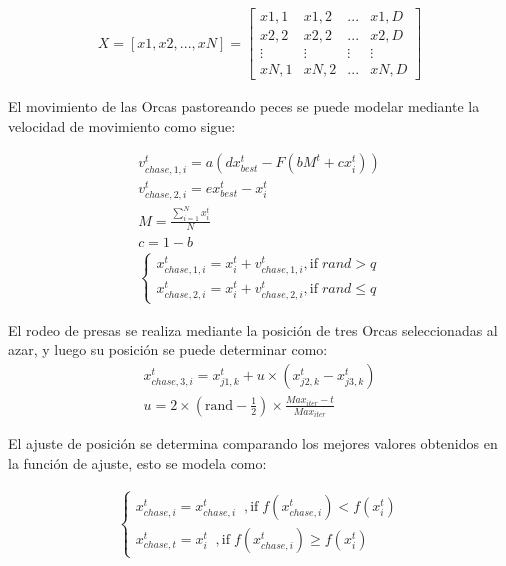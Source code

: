 \documentclass[conference]{IEEEtran}
\begin{document}
\begin{equation}
\begin{gathered}
X = [ x1, x2, ..., xN ] =\begin{bmatrix}
  x1,1 & x1,2 & ... & x1,D  \\
  x2,2 & x2,2 & ... & x2,D  \\
  \vdots & \vdots & \vdots & \vdots \\
  xN,1 & xN,2 & ... & xN,D
\end{bmatrix}
\end{gathered}
\label{eq18}
\end{equation}

\noindent El movimiento de las Orcas pastoreando peces se puede modelar mediante la velocidad de movimiento como sigue:

\begin{equation}
\begin{gathered}
v_{chase,1,i}^t = a ( d x_{best}^t - F (b M^t + c x_i^t)) \\
v_{chase,2,i}^t = e x_{best}^t - x_{i}^t \\
M = \frac{\sum_{i=1}^{N} x_i^t}{N} \\
c=1-b \\
\begin{cases}
  x_{chase,1,i}^t = x_{i}^t + v_{chase,1,i}^t , \text{if} \;rand > q \\
  x_{chase,2,i}^t = x_{i}^t + v_{chase,2,i}^t  , \text{if} \;rand \leq q
\end{cases}
\end{gathered}
\label{eq19}
\end{equation}

\noindent El rodeo de presas se realiza mediante la posición de tres Orcas seleccionadas al azar, y luego su posición se puede determinar como:
\begin{equation}
\begin{gathered}
x_{chase,3,i}^t =x_{j1,k}^t +u \times (x_{j2,k}^t - x_{j3,k}^t ) \\
u = 2 \times (\text{rand} - \frac{1}{2}) \times \frac{Max_{iter}-t}{Max_{iter}}
\end{gathered}
\label{eq20}
\end{equation}

\noindent El ajuste de posición se determina comparando los mejores valores obtenidos en la función de ajuste, esto se modela como:

\begin{equation}
\begin{gathered}
\begin{cases}
  x_{chase,i}^t = x_{chase,i}^t \;\;, \text{if} \; f(x_{chase,i}^t) < f(x_{i}^t ) \\
  x_{chase,t}^t = x_{i}^t  \;\;, \text{if} \;f(x_{chase,i}^t) \geq f(x_{i}^t )
\end{cases}
\end{gathered}
\label{eq21}
\end{equation}
\end{document}
